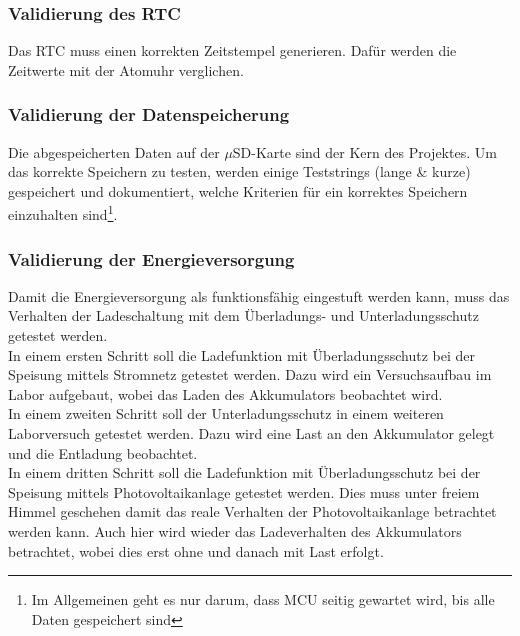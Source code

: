\subsubsection{Validierung des RTC}
Das RTC muss einen korrekten Zeitstempel generieren. Dafür werden die Zeitwerte mit der Atomuhr verglichen.\\
\subsubsection{Validierung der Datenspeicherung}
Die abgespeicherten Daten auf der $\mu$SD-Karte sind der Kern des Projektes. Um das korrekte Speichern zu testen, werden einige Teststrings (lange \& kurze) gespeichert und dokumentiert, welche Kriterien für ein korrektes Speichern einzuhalten sind\footnote{Im Allgemeinen geht es nur darum, dass MCU seitig gewartet wird, bis alle Daten gespeichert sind}.\\
\subsubsection{Validierung der Energieversorgung}
\label{subsubsec:validierungenergieversorgung}
Damit die Energieversorgung als funktionsfähig eingestuft werden kann, muss das Verhalten der Ladeschaltung mit dem Überladungs- und Unterladungsschutz getestet werden.\\
In einem ersten Schritt soll die Ladefunktion mit Überladungsschutz bei der Speisung mittels Stromnetz getestet werden. Dazu wird ein Versuchsaufbau im Labor aufgebaut, wobei das Laden des Akkumulators beobachtet wird.\\
In einem zweiten Schritt soll der Unterladungsschutz in einem weiteren Laborversuch getestet werden. Dazu wird eine Last an den Akkumulator gelegt und die Entladung beobachtet.\\
In einem dritten Schritt soll die Ladefunktion mit Überladungsschutz bei der Speisung mittels Photovoltaikanlage getestet werden. Dies muss unter freiem Himmel geschehen damit das reale Verhalten der Photovoltaikanlage betrachtet werden kann. Auch hier wird wieder das Ladeverhalten des Akkumulators betrachtet, wobei dies erst ohne und danach mit Last erfolgt.\\